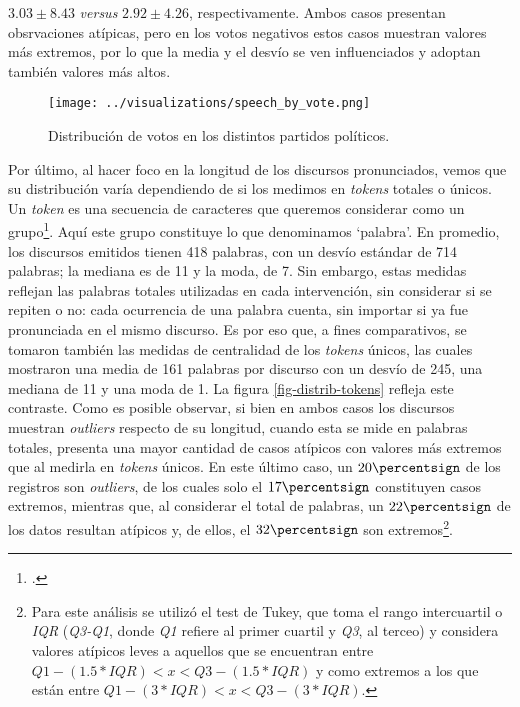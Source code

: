 $3.03\pm8.43$ \textit{versus} 
$2.92\pm4.26$, respectivamente.
Ambos casos presentan obsrvaciones atípicas, pero en los votos
negativos estos casos muestran valores más extremos, por lo que la media y el desvío se
ven influenciados y adoptan también valores más altos.

\begin{figure}[h!]
    \centering
    \texttt{[image: ../visualizations/speech\_by\_vote.png]}
    \caption{Distribución de votos en los distintos partidos políticos.}%
    \label{fig-distrib-speech}
\end{figure}

Por último, al hacer foco en la longitud de los discursos pronunciados, vemos que su
distribución varía dependiendo de si los medimos en \textit{tokens} totales o únicos.
Un \textit{token} es una secuencia de caracteres que queremos considerar como un
grupo\footnote{\citet*{bird2009natural}.}. Aquí este grupo constituye lo que denominamos
`palabra'. En promedio, los discursos emitidos tienen 418 palabras, con un desvío
estándar de 714 palabras; la mediana es de 11 y la moda, de 7. Sin embargo, estas medidas
reflejan las palabras totales utilizadas en cada intervención, sin considerar si se repiten
o no: cada ocurrencia de una palabra cuenta, sin importar si ya fue pronunciada en el mismo
discurso. Es por eso que, a fines comparativos, se tomaron también las medidas de centralidad
de los \textit{tokens} únicos, las cuales mostraron una media de 161 palabras por discurso
con un desvío de 245, una mediana de 11 y una moda de 1. La figura \ref{fig-distrib-tokens}
refleja este contraste. Como es posible observar, si bien en ambos casos los discursos
muestran \textit{outliers} respecto de su longitud, cuando esta se mide en palabras
totales, presenta una mayor cantidad de casos atípicos con valores más extremos que
al medirla en \textit{tokens} únicos. En este último caso, un
$20\percentsign$ de los registros son \textit{outliers}, de los cuales solo el
$17\percentsign$ constituyen casos extremos, mientras que, al considerar
el total de palabras, un $22\percentsign$ de los datos resultan atípicos y,
de ellos, el $32\percentsign$ son extremos\footnote{Para este análisis se utilizó el
test de Tukey, que toma el rango intercuartil o \textit{IQR} (\textit{Q3-Q1}, donde
\textit{Q1} refiere al primer cuartil y \textit{Q3}, al terceo) y considera
valores atípicos leves a aquellos que se encuentran entre
$Q1 - (1.5 * IQR) < x < Q3 - (1.5 * IQR)$ y como extremos a los que están entre
$Q1 - (3 * IQR) < x < Q3 - (3 * IQR)$.}.

